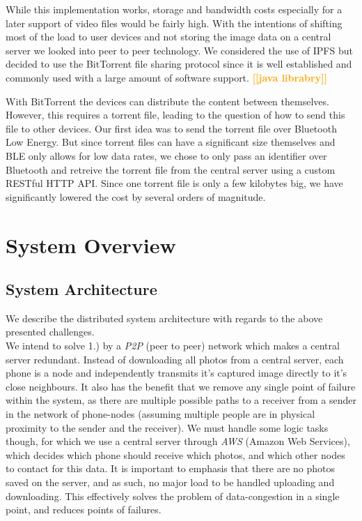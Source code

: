 \documentclass{report}
\newcommand{\todo}[1]{\textsf{\textbf{\textcolor{orange}{[[#1]]}}}}
\begin{document}
While this implementation works, storage and bandwidth costs especially for a later support of video files would be fairly high. With the intentions of shifting most of the load to user devices and not storing the image data on a central server we looked into peer to peer technology. We considered the use of IPFS but decided to use the BitTorrent file sharing protocol since it is well established and commonly used with a large amount of software support. \todo{java librabry} 

With BitTorrent the devices can distribute the content between themselves. However, this requires a torrent file, leading to the question of how to send this file to other devices. Our first idea was to send the torrent file over Bluetooth Low Energy. But since torrent files can have a significant size themselves and BLE only allows for low data rates, we chose to only pass an identifier over Bluetooth and retreive the torrent file from the central server  using a custom RESTful HTTP API. Since one torrent file is only a few kilobytes big, we have significantly lowered the cost by several orders of magnitude.


\section{System Overview}


\subsection{System Architecture}
We describe the distributed system architecture with regards to the above presented challenges. \\

We intend to solve 1.) by a \textit{P2P} (peer to peer) network which makes a central server redundant.
Instead of downloading all photos from a central server, each phone is a node and independently transmits it's captured image directly to it's close neighbours. 
It also has the benefit that we remove any single point of failure within the system, as there are multiple possible paths to a receiver from a sender in the network of phone-nodes (assuming multiple people are in physical proximity to the sender and the receiver). 
We must handle some logic tasks though, for which we use a central server through \textit{AWS} (Amazon Web Services), which decides which phone should receive which photos, and which other nodes to contact for this data. 
It is important to emphasis that there are no photos saved on the server, and as such, no major load to be handled uploading and downloading.
This effectively solves the problem of data-congestion in a single point, and reduces points of failures. 
\end{document}
